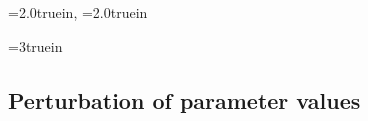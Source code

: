 



\centerline{\epsfxsize=2.0truein, \epsfxsize=2.0truein}
\caption{Left panel: Pairs
of $(\overline c, \hat c)$ that satisfy
$u(\overline c) + \beta w^+ \geq u(\overline y)
  + \beta v_{\rm aut}$.  Right panel: Pairs of
$(\overline c, \hat c)$ that satisfy $u(1-\hat c) + \beta w^- \geq
u(0.5)
  + \beta v_{\rm aut}$. }
\endfigure
\medskip
%





\centerline{\epsfxsize=3truein}
\caption{Pairs of $(\overline c, \hat c)$ that satisfy
$u(\overline c) + \beta w^+ \geq u(\overline y)
  + \beta v_{\rm aut}$ and $u(1-\hat c) + \beta w^- \geq u(0.5)
+ \beta v_{\rm aut}$.  The efficient stationary allocation
within this set is marked with a circle.}
\endfigure

\newpage
\subsection{Perturbation of parameter values}

